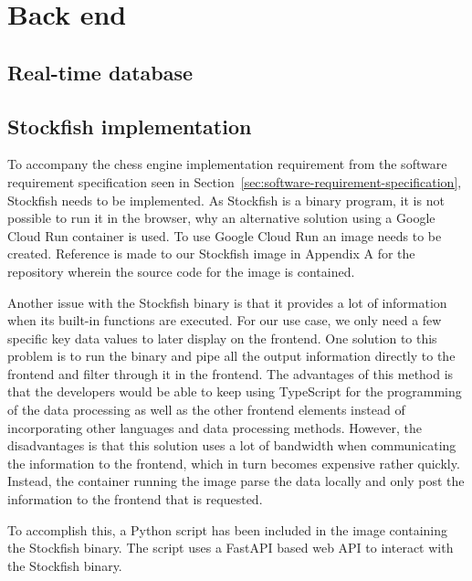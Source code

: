 \section{Back end}\label{sec:backend}

\subsection{Real-time database}\label{subsec:realtime-database}

\subsection{Stockfish implementation}\label{subsec:stockfish-implementation}

To accompany the chess engine implementation requirement from the software requirement specification seen in
Section~\ref{sec:software-requirement-specification}, Stockfish needs to be implemented.
As Stockfish is a binary program, it is not possible to run it in the browser, why an alternative solution using a
Google Cloud Run container is used.
To use Google Cloud Run an image needs to be created.
Reference is made to our Stockfish image in Appendix A for the repository wherein the source code for the image is
contained.

Another issue with the Stockfish binary is that it provides a lot of information when its built-in functions are
executed.
For our use case, we only need a few specific key data values to later display on the frontend.
One solution to this problem is to run the binary and pipe all the output information directly to the frontend and
filter through it in the frontend.
The advantages of this method is that the developers would be able to keep using TypeScript for the programming of the
data processing as well as the other frontend elements instead of incorporating other languages and data processing
methods.
However, the disadvantages is that this solution uses a lot of bandwidth when communicating the information to the
frontend, which in turn becomes expensive rather quickly.
Instead, the container running the image parse the data locally and only post the information to the frontend that is
requested.

To accomplish this, a Python script has been included in the image containing the Stockfish binary.
The script uses a FastAPI based web API to interact with the Stockfish binary.

